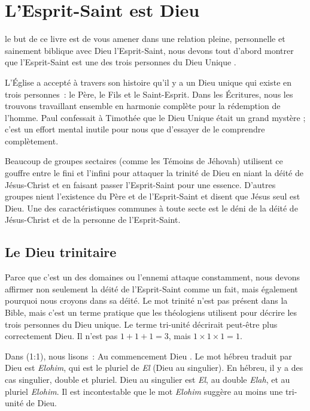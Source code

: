 \chapter{L'Esprit-Saint est Dieu}

 le but de ce livre est de vous amener
 dans une relation pleine, personnelle et sainement biblique avec
 Dieu l'Esprit-Saint, nous devons tout d'abord montrer que l'Esprit-Saint
 est une des trois personnes du Dieu Unique
 .

L'Église a accepté à travers son histoire qu'il y a un Dieu unique
 qui existe en trois personnes~: le Père, le Fils et le Saint-Esprit.
 Dans les Écritures, nous les trouvons travaillant ensemble en harmonie
 complète pour la rédemption de l'homme.
 Paul confessait à Timothée que le Dieu Unique était un grand mystère ;
 c'est un effort mental inutile pour nous que d'essayer de le comprendre
 complètement.

Beaucoup de groupes sectaires (comme les Témoins de Jéhovah) utilisent
 ce gouffre entre le fini et l'infini pour attaquer la trinité de Dieu
 en niant la déité de Jésus-Christ et en faisant passer l'Esprit-Saint
 pour une essence.
 D'autres groupes nient l'existence du Père et de l'Esprit-Saint et disent
 que Jésus seul est Dieu.
 Une des caractéristiques communes à toute secte est le déni de la déité
 de Jésus-Christ et de la personne de l'Esprit-Saint.

\section*{Le Dieu trinitaire}

Parce que c'est un des domaines ou l'ennemi attaque constamment, nous devons
 affirmer non seulement la déité de l'Esprit-Saint comme un fait,
 mais également pourquoi nous croyons dans sa déité.
 Le mot \og trinité \fg{} n'est pas présent dans la Bible, mais c'est un
 terme pratique que les théologiens utilisent pour décrire les trois personnes
 du Dieu unique.
 Le terme \og tri-unité \fg{} décrirait peut-être plus correctement Dieu.
 Il n'est pas $1 + 1 + 1 = 3$, mais $1 \times 1 \times 1 = 1$.

Dans (1:1), nous lisons~:
 \og Au commencement Dieu \fg{}.
 Le mot hébreu traduit par \og Dieu \fg{} est \emph{Elohim}, qui est
 le pluriel de \emph{El} (Dieu au singulier).
 En hébreu, il y a des cas singulier, double et pluriel.
 \og Dieu \fg{} au singulier est \emph{El}, au double \emph{Elah},
 et au pluriel \emph{Elohim}.
 Il est incontestable que le mot \emph{Elohim} suggère au moins
 une tri-unité de Dieu.

